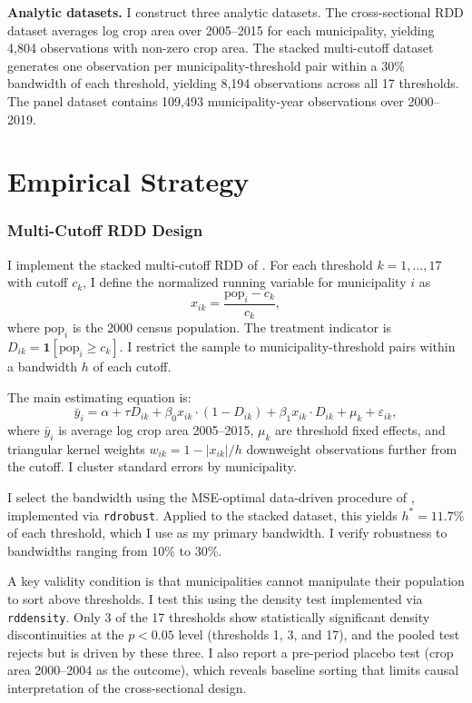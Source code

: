 \documentclass[12pt]{article}
\begin{document}
\textbf{Analytic datasets.} I construct three analytic datasets. The cross-sectional RDD dataset averages log crop area over 2005--2015 for each municipality, yielding 4,804 observations with non-zero crop area. The stacked multi-cutoff dataset generates one observation per municipality-threshold pair within a 30\% bandwidth of each threshold, yielding 8,194 observations across all 17 thresholds. The panel dataset contains 109,493 municipality-year observations over 2000--2019.

\section{Empirical Strategy}

\subsubsection*{Multi-Cutoff RDD Design}

I implement the stacked multi-cutoff RDD of \citet{cattaneo2021regression}. For each threshold $k = 1, \ldots, 17$ with cutoff $c_k$, I define the normalized running variable for municipality $i$ as
\[
x_{ik} = \frac{\text{pop}_i - c_k}{c_k},
\]
where $\text{pop}_i$ is the 2000 census population. The treatment indicator is $D_{ik} = \mathbf{1}[\text{pop}_i \geq c_k]$. I restrict the sample to municipality-threshold pairs within a bandwidth $h$ of each cutoff.

The main estimating equation is:
\[
\bar{y}_i = \alpha + \tau D_{ik} + \beta_0 x_{ik} \cdot (1 - D_{ik}) + \beta_1 x_{ik} \cdot D_{ik} + \mu_k + \varepsilon_{ik},
\]
where $\bar{y}_i$ is average log crop area 2005--2015, $\mu_k$ are threshold fixed effects, and triangular kernel weights $w_{ik} = 1 - |x_{ik}|/h$ downweight observations further from the cutoff. I cluster standard errors by municipality.

I select the bandwidth using the MSE-optimal data-driven procedure of \citet{calonico2014robust}, implemented via \texttt{rdrobust}. Applied to the stacked dataset, this yields $h^* = 11.7\%$ of each threshold, which I use as my primary bandwidth. I verify robustness to bandwidths ranging from 10\% to 30\%.

A key validity condition is that municipalities cannot manipulate their population to sort above thresholds. I test this using the \citet{cattaneo2018manipulation} density test implemented via \texttt{rddensity}. Only 3 of the 17 thresholds show statistically significant density discontinuities at the $p < 0.05$ level (thresholds 1, 3, and 17), and the pooled test rejects but is driven by these three. I also report a pre-period placebo test (crop area 2000--2004 as the outcome), which reveals baseline sorting that limits causal interpretation of the cross-sectional design.
\end{document}
